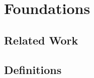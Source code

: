 \section{Foundations}
\label{sec:foundations}

\blindtext


\subsection{Related Work}
\label{subsec:rel_work}

\blindtext


\subsection{Definitions}
\label{subsec:defs}

\blindtext